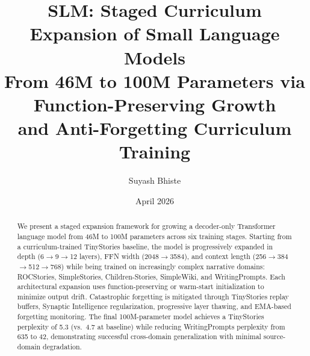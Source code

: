 \documentclass[11pt,a4paper]{article}
\title{
  \vspace{-1cm}
  \textbf{SLM: Staged Curriculum Expansion of Small Language Models}\\[4pt]
  \large From 46M to 100M Parameters via Function-Preserving Growth\\
  and Anti-Forgetting Curriculum Training
}
\author{Suyash Bhiste}
\date{April 2026}
\begin{document}
\maketitle

\begin{abstract}
We present a staged expansion framework for growing a decoder-only Transformer
language model from 46M to 100M parameters across six training stages.  Starting
from a curriculum-trained TinyStories baseline, the model is progressively
expanded in depth (6$\to$9$\to$12 layers), FFN width (2048$\to$3584), and
context length (256$\to$384$\to$512$\to$768) while being trained on
increasingly complex narrative domains: ROCStories, SimpleStories,
Children-Stories, SimpleWiki, and WritingPrompts.  Each architectural expansion
uses function-preserving or warm-start initialization to minimize output drift.
Catastrophic forgetting is mitigated through TinyStories replay buffers,
Synaptic Intelligence regularization, progressive layer thawing, and
EMA-based forgetting monitoring.  The final 100M-parameter model achieves a
TinyStories perplexity of 5.3 (vs.\ 4.7 at baseline) while reducing
WritingPrompts perplexity from 635 to 42, demonstrating successful
cross-domain generalization with minimal source-domain degradation.
\end{abstract}

\tableofcontents
\newpage













\end{document}
